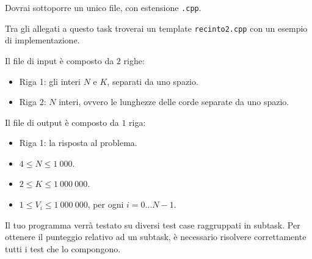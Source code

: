 Dovrai sottoporre un unico file, con estensione \texttt{.cpp}.

\begin{warning}
    Tra gli allegati a questo task troverai un template \texttt{recinto2.cpp} con un esempio di implementazione.
\end{warning}

Il file di input è composto da $2$ righe:
\begin{itemize}
    \item Riga 1: gli interi $N$ e $K$, separati da uno spazio.
    \item Riga 2: $N$ interi, ovvero le lunghezze delle corde separate da uno spazio.
\end{itemize}

Il file di output è composto da $1$ riga:
\begin{itemize}
    \item Riga 1: la risposta al problema.
\end{itemize}


\Constraints

\begin{itemize}[nolistsep, itemsep=2mm]
    \item $4 \le N \le 1\:000$.
    \item $2 \le K \le 1\:000\:000$.
    \item $1 \le V_i \le 1\:000\:000$, per ogni $i = 0 \dots N-1$.
\end{itemize}


\Scoring

Il tuo programma verrà testato su diversi test case raggruppati in subtask.
Per ottenere il punteggio relativo ad un subtask,
è necessario risolvere correttamente tutti i test che lo compongono.







